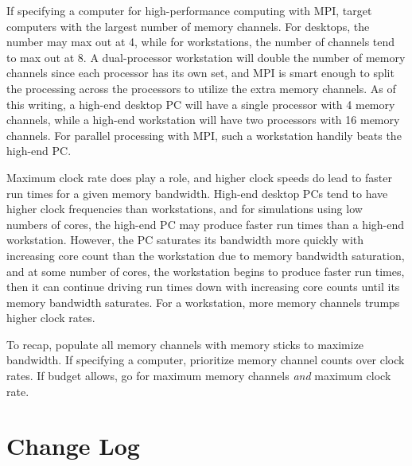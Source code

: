 \documentclass[titlepage]{article}
\renewcommand\_{\textunderscore\linebreak[1]}
\begin{document}
If specifying a computer for high-performance computing with MPI, target computers with the largest number of memory channels.  For desktops, the number may max out at 4, while for workstations, the number of channels tend to max out at 8.  A dual-processor workstation will double the number of memory channels since each processor has its own set, and MPI is smart enough to split the processing across the processors to utilize the extra memory channels. As of this writing, a high-end desktop PC will have a single processor with 4 memory channels, while a high-end workstation will have two processors with 16 memory channels.  For parallel processing with MPI, such a workstation handily beats the high-end PC.

Maximum clock rate does play a role, and higher clock speeds do lead to faster run times for a given memory bandwidth.  High-end desktop PCs tend to have higher clock frequencies than workstations, and for simulations using low numbers of cores, the high-end PC may produce faster run times than a high-end workstation.  However, the PC saturates its bandwidth more quickly with increasing core count than the workstation due to memory bandwidth saturation, and at some number of cores, the workstation begins to produce faster run times, then it can continue driving run times down with increasing core counts until its memory bandwidth saturates.  For a workstation, more memory channels trumps higher clock rates.

To recap, populate all memory channels with memory sticks to maximize bandwidth. If specifying a computer, prioritize memory channel counts over clock rates.  If budget allows, go for maximum memory channels \textit{and} maximum clock rate.

\section{Change Log}
\end{document}
